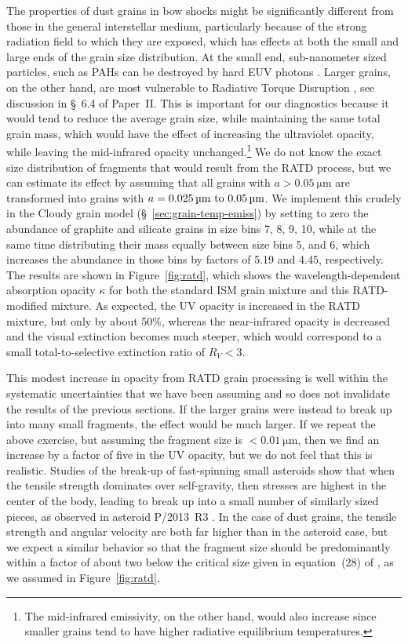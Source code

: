 The properties of dust grains in bow shocks might be significantly
different from those in the general interstellar medium, particularly
because of the strong radiation field to which they are exposed, which
has effects at both the small and large ends of the grain size
distribution.  At the small end, sub-nanometer sized particles, such
as PAHs can be destroyed by hard EUV photons
\citep{Lebouteiller:2007a, Lebouteiller:2011a}.  Larger grains, on the
other hand, are most vulnerable to Radiative Torque Disruption
\citep[RATD;][]{Hoang:2018a}, see discussion in \S~6.4 of Paper~II.\@
This is important for our diagnostics because it would tend to reduce
the average grain size, while maintaining the same total grain mass,
which would have the effect of increasing the ultraviolet opacity,
while leaving the mid-infrared opacity unchanged.\footnote{The
  mid-infrared emissivity, on the other hand, would also increase
  since smaller grains tend to have higher radiative equilibrium
  temperatures.} %
We do not know the exact size distribution of fragments that would
result from the RATD process, but we can estimate its effect by
assuming that all grains with \(a > \SI{0.05}{\um}\) are transformed
into grains with \(a = \text{\SIrange{0.025}{0.05}{\um}}\).  We
implement this crudely in the Cloudy grain model
(\S~\ref{sec:grain-temp-emiss}) by setting to zero the abundance of
graphite and silicate grains in size bins 7, 8, 9, 10, while at the
same time distributing their mass equally between size bins 5, and 6,
which increases the abundance in those bins by factors of 5.19 and
4.45, respectively.  The results are shown in Figure~\ref{fig:ratd},
which shows the wavelength-dependent absorption opacity \(\kappa\) for
both the standard ISM grain mixture and this RATD-modified mixture.
As expected, the UV opacity is increased in the RATD mixture, but only
by about 50\%, whereas the near-infrared opacity is decreased and the
visual extinction becomes much steeper, which would correspond to a
small total-to-selective extinction ratio of \(R_V < 3\).

This modest increase in opacity from RATD grain processing is well
within the systematic uncertainties that we have been assuming and so
does not invalidate the results of the previous sections.  If the
larger grains were instead to break up into many small fragments, the
effect would be much larger.  If we repeat the above exercise, but
assuming the fragment size is \(< \SI{0.01}{\um}\), then we find an
increase by a factor of five in the UV opacity, but we do not feel
that this is realistic. Studies of the break-up of fast-spinning small
asteroids \citep{Hirabayashi:2015a, Zhang:2018a} show that when the
tensile strength dominates over self-gravity, then stresses are
highest in the center of the body, leading to break up into a small
number of similarly sized pieces, as observed in asteroid P/2013~R3
\citep{Jewitt:2014a}.  In the case of dust grains, the tensile
strength and angular velocity are both far higher than in the asteroid
case, but we expect a similar behavior so that the fragment size
should be predominantly within a factor of about two below the
critical size given in equation~(28) of \citet{Hoang:2018a}, as we
assumed in Figure~\ref{fig:ratd}.


